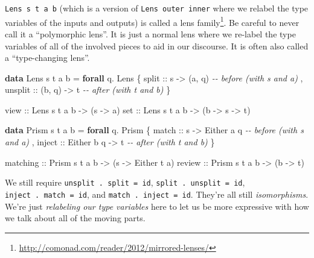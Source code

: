 \documentclass[]{article}
\newenvironment{Shaded}{}{}
\newcommand{\CommentTok}[1]{\textcolor[rgb]{0.38,0.63,0.69}{\textit{#1}}}
\newcommand{\DataTypeTok}[1]{\textcolor[rgb]{0.56,0.13,0.00}{#1}}
\newcommand{\KeywordTok}[1]{\textcolor[rgb]{0.00,0.44,0.13}{\textbf{#1}}}
\newcommand{\NormalTok}[1]{#1}
\newcommand{\OperatorTok}[1]{\textcolor[rgb]{0.40,0.40,0.40}{#1}}
\newcommand{\OtherTok}[1]{\textcolor[rgb]{0.00,0.44,0.13}{#1}}
\renewcommand{\href}[2]{#2\footnote{\url{#1}}}
\begin{document}
\texttt{Lens\ s\ t\ a\ b} (which is a version of
\texttt{Lens\textquotesingle{}\ outer\ inner} where we relabel the type
variables of the inputs and outputs) is called a
\href{http://comonad.com/reader/2012/mirrored-lenses/}{lens family}. Be careful
to never call it a ``polymorphic lens''. It is just a normal lens where we
re-label the type variables of all of the involved pieces to aid in our
discourse. It is often also called a ``type-changing lens''.

\begin{Shaded}
\begin{Highlighting}[]
\KeywordTok{data} \DataTypeTok{Lens}\NormalTok{ s t a b }\OtherTok{=} \KeywordTok{forall}\NormalTok{ q}\OperatorTok{.} \DataTypeTok{Lens}
\NormalTok{    \{}\OtherTok{ split   ::}\NormalTok{ s }\OtherTok{{-}>}\NormalTok{ (a, q)        }\CommentTok{{-}{-} before (with s and a)}
\NormalTok{    ,}\OtherTok{ unsplit ::}\NormalTok{ (b, q) }\OtherTok{{-}>}\NormalTok{ t        }\CommentTok{{-}{-} after  (with t and b)}
\NormalTok{    \}}

\OtherTok{view ::} \DataTypeTok{Lens}\NormalTok{ s t a b }\OtherTok{{-}>}\NormalTok{ (s }\OtherTok{{-}>}\NormalTok{ a)}
\OtherTok{set  ::} \DataTypeTok{Lens}\NormalTok{ s t a b }\OtherTok{{-}>}\NormalTok{ (b }\OtherTok{{-}>}\NormalTok{ s }\OtherTok{{-}>}\NormalTok{ t)}

\KeywordTok{data} \DataTypeTok{Prism}\NormalTok{ s t a b }\OtherTok{=} \KeywordTok{forall}\NormalTok{ q}\OperatorTok{.} \DataTypeTok{Prism}
\NormalTok{    \{}\OtherTok{ match  ::}\NormalTok{ s }\OtherTok{{-}>} \DataTypeTok{Either}\NormalTok{ a q     }\CommentTok{{-}{-} before (with s and a)}
\NormalTok{    ,}\OtherTok{ inject ::} \DataTypeTok{Either}\NormalTok{ b q }\OtherTok{{-}>}\NormalTok{ t     }\CommentTok{{-}{-} after  (with t and b)}
\NormalTok{    \}}

\OtherTok{matching ::} \DataTypeTok{Prism}\NormalTok{ s t a b }\OtherTok{{-}>}\NormalTok{ (s }\OtherTok{{-}>} \DataTypeTok{Either}\NormalTok{ t a)}
\OtherTok{review   ::} \DataTypeTok{Prism}\NormalTok{ s t a b }\OtherTok{{-}>}\NormalTok{ (b }\OtherTok{{-}>}\NormalTok{ t)}
\end{Highlighting}
\end{Shaded}

We still require \texttt{unsplit\ .\ split\ =\ id},
\texttt{split\ .\ unsplit\ =\ id}, \texttt{inject\ .\ match\ =\ id}, and
\texttt{match\ .\ inject\ =\ id}. They're all still \emph{isomorphisms}. We're
just \emph{relabeling our type variables} here to let us be more expressive with
how we talk about all of the moving parts.
\end{document}
